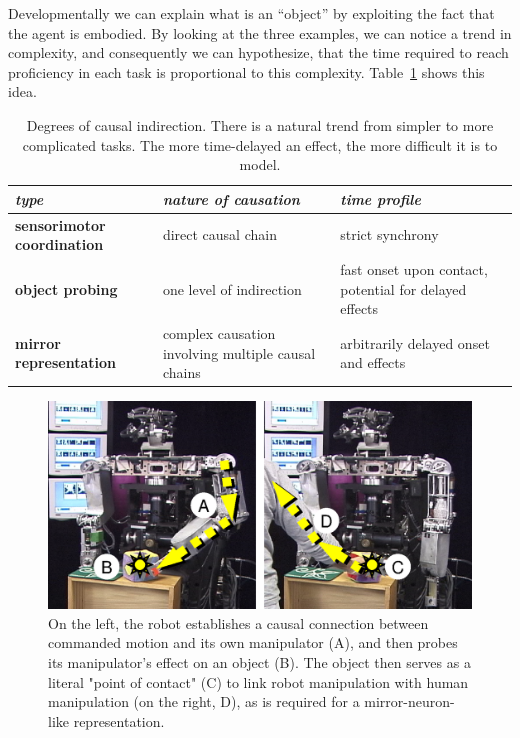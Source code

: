Developmentally we can explain what is an ``object'' by exploiting
the fact that the agent is embodied.
By looking at the three examples, we can notice a trend in complexity, 
and consequently we can hypothesize, that the time required to reach proficiency 
in each task is proportional to this complexity. Table~\ref{tab:causation} shows this idea.
\fi

\ifverbose
\begin{table}[htbp]
\begin{center}
\begin{tabular}{|p{4.8cm}|p{4.8cm}|p{4.8cm}|}
\hline
{\it type} & {\it nature of causation} &  {\it time profile} \\ \hline\hline
{\bf sensorimotor coordination} & direct causal chain & strict synchrony \\ \hline
{\bf object probing} & one level of indirection & fast onset upon contact, potential for delayed effects\\ \hline
{\bf mirror representation} &  complex causation involving multiple causal chains & arbitrarily delayed onset and effects\\ \hline
\end{tabular}
\caption{
\label{tab:causation}
%
Degrees of causal indirection. There is a natural
trend from simpler to more complicated tasks.  The more time-delayed
an effect, the more difficult it is to model.
%
}
\end{center}
\end{table}
\fi

%
\begin{figure}[tb]
\begin{center}
\includegraphics[width=\columnwidth]{tracing_causes.eps}
\caption{ 
\label{fig:tracing-causes}
%
On the left, the robot establishes a causal connection between
commanded motion and its own manipulator (A), and then probes its
manipulator's effect on an object (B).  The object then serves as a
literal "point of contact" (C) to link robot manipulation with human
manipulation (on the right, D), as is required for a mirror-neuron-like
representation.
%
}
\end{center}
\end{figure}
%



